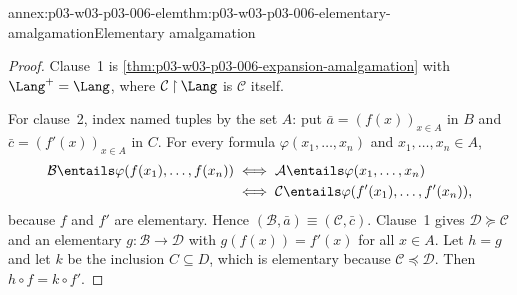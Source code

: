\begin{annexitem}{annex:p03-w03-p03-006-elem}{thm:p03-w03-p03-006-elementary-amalgamation}{Elementary amalgamation}
\begin{proof}
Clause~1 is \cref{thm:p03-w03-p03-006-expansion-amalgamation} with
\(\Lang^+=\Lang\), where \(\mathcal C\mathbin{\upharpoonright}\Lang\) is
\(\mathcal C\) itself.

For clause~2, index named tuples by the set \(A\): put
\(\bar a=(f(x))_{x\in A}\) in \(B\) and \(\bar c=(f'(x))_{x\in A}\) in
\(C\).  For every formula \(\varphi(x_1,\ldots,x_n)\) and
\(x_1,\ldots,x_n\in A\),
\begin{align*}
 \mathcal B\entails\varphi(f(x_1),\ldots,f(x_n))
 &\iff \mathcal A\entails\varphi(x_1,\ldots,x_n)\\
 &\iff \mathcal C\entails\varphi(f'(x_1),\ldots,f'(x_n)),
\end{align*}
because \(f\) and \(f'\) are elementary.  Hence
\((\mathcal B,\bar a)\equiv(\mathcal C,\bar c)\).  Clause~1 gives
\(\mathcal D\succcurlyeq\mathcal C\) and an elementary
\(g:\mathcal B\to\mathcal D\) with \(g(f(x))=f'(x)\) for all \(x\in A\).
Let \(h=g\) and let \(k\) be the inclusion \(C\subseteq D\), which is
elementary because \(\mathcal C\preccurlyeq\mathcal D\).  Then
\(h\circ f=k\circ f'\).
\end{proof}
\end{annexitem}

